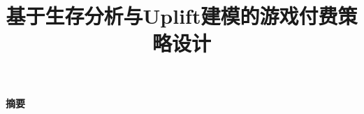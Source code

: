 \documentclass[12pt,a4paper]{ctexart}
\title{\vspace{-0.8cm}\textbf{基于生存分析与Uplift建模的游戏付费策略设计}}
\author{}
\date{}
\begin{document}
\maketitle
\thispagestyle{empty}

\begin{center}
\large\textbf{摘要}
\end{center}



\clearpage
{}
\setcounter{page}{1}











\end{document}
